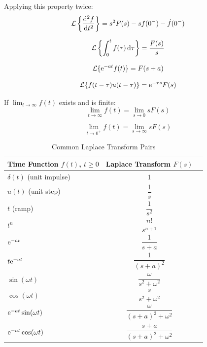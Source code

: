 Applying this property twice:
\begin{equation}
\mathcal{L}\left\{\frac{\mathrm{d}^2 f}{\mathrm{d} t^2}\right\} = s^2F(s) - sf(0^-) - \dot{f}(0^-)
\label{eq:second_diff}
\end{equation}

\begin{property}
\begin{equation}
\mathcal{L}\left\{\int_0^t f(\tau)\,\mathrm{d}\tau\right\} = \frac{F(s)}{s}
\end{equation}
\end{property}

\begin{property}
\begin{equation}
\mathcal{L}\{\mathrm{e}^{-at}f(t)\} = F(s+a)
\end{equation}
\end{property}

\begin{property}
\begin{equation}
\mathcal{L}\{f(t-\tau)u(t-\tau)\} = \mathrm{e}^{-\tau s}F(s)
\end{equation}
\end{property}

\begin{property}
If $\lim_{t\to\infty}f(t)$ exists and is finite:
\begin{equation}
\lim_{t\to\infty}f(t) = \lim_{s\to 0}sF(s)
\label{eq:final_value}
\end{equation}
\end{property}

\begin{property}
\begin{equation}
\lim_{t\to 0^+}f(t) = \lim_{s\to\infty}sF(s)
\end{equation}
\end{property}

\begin{table}[h]
\centering
\caption{Common Laplace Transform Pairs}
\label{tab:laplace_pairs}
\begin{tabular}{@{}lcc@{}}
\toprule
\textbf{Time Function} $f(t)$, $t \geq 0$ & \textbf{Laplace Transform} $F(s)$ \\
\midrule
$\delta(t)$ (unit impulse) & $1$ \\
$u(t)$ (unit step) & $\dfrac{1}{s}$ \\
$t$ (ramp) & $\dfrac{1}{s^2}$ \\
$t^n$ & $\dfrac{n!}{s^{n+1}}$ \\
$\mathrm{e}^{-at}$ & $\dfrac{1}{s+a}$ \\
$t\mathrm{e}^{-at}$ & $\dfrac{1}{(s+a)^2}$ \\
$\sin(\omega t)$ & $\dfrac{\omega}{s^2+\omega^2}$ \\
$\cos(\omega t)$ & $\dfrac{s}{s^2+\omega^2}$ \\
$\mathrm{e}^{-at}\sin(\omega t)$ & $\dfrac{\omega}{(s+a)^2+\omega^2}$ \\
$\mathrm{e}^{-at}\cos(\omega t)$ & $\dfrac{s+a}{(s+a)^2+\omega^2}$ \\
\bottomrule
\end{tabular}
\end{table}

